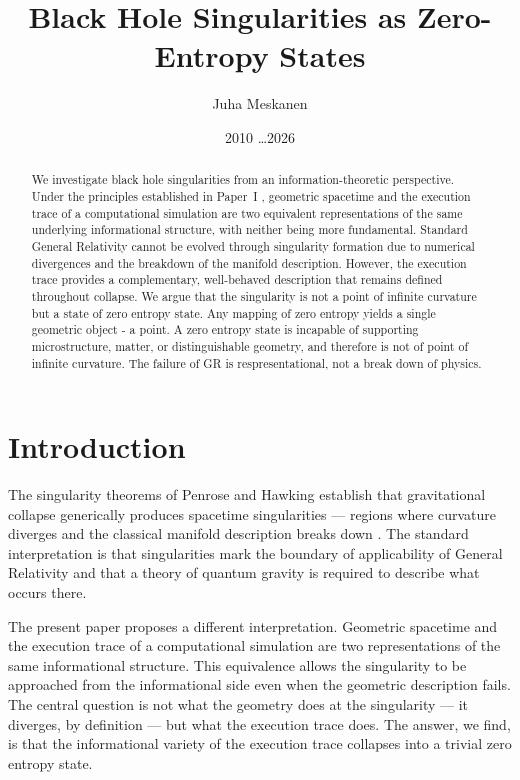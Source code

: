 \documentclass[11pt]{article}
\title{Black Hole Singularities as Zero-Entropy States}
\author{Juha Meskanen}
\date{2010 \dots 2026}
\begin{document}
\maketitle

\begin{abstract}
We investigate black hole singularities from an information-theoretic
perspective. Under the principles established in
Paper~I \cite{meskanen2001}, geometric spacetime and the execution
trace of a computational simulation are two equivalent representations of
the same underlying informational structure, with neither being more
fundamental. Standard General Relativity cannot be evolved through
singularity formation due to numerical divergences and the breakdown of
the manifold description. However, the execution trace provides a complementary,
well-behaved description that remains defined throughout collapse. 
We argue that the singularity is not a point of infinite curvature
but a state of zero entropy state. Any mapping of zero entropy
yields a single geometric object - a point. A zero entropy state
is incapable of supporting microstructure, matter, or distinguishable geometry, and 
therefore is not of point of infinite curvature. The failure of
GR is respresentational, not a break down of physics.
\end{abstract}

\section{Introduction}
\label{sec:intro}

The singularity theorems of Penrose and Hawking establish that gravitational
collapse generically produces spacetime singularities --- regions where
curvature diverges and the classical manifold description breaks down
\cite{penrose1965, hawking1970}. The standard interpretation is that
singularities mark the boundary of applicability of General Relativity and
that a theory of quantum gravity is required to describe what occurs there.

The present paper proposes a different interpretation.
Geometric spacetime and the execution trace
of a computational simulation are two representations of the same
informational structure. This equivalence allows the
singularity to be approached from the informational side even when the
geometric description fails. The central question is not what the geometry
does at the singularity --- it diverges, by definition --- but what the
execution trace does. The answer, we find, is that the informational variety 
of the execution trace collapses into a trivial zero entropy state.
\end{document}

